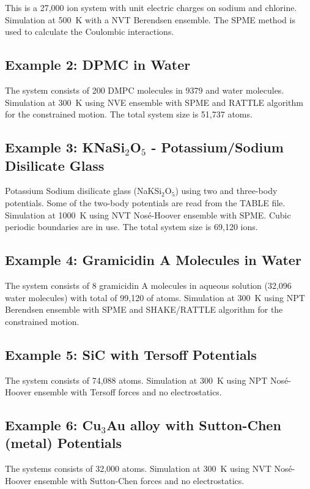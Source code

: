 This is a 27,000 ion system with unit electric charges on sodium and
chlorine.  Simulation at 500~K with a NVT Berendsen ensemble.  The SPME
method is used to calculate the Coulombic interactions.

\subsection{Example 2: DPMC in Water}

The system consists of 200 DMPC molecules in 9379 and water molecules.
Simulation at 300~K using NVE ensemble with SPME and RATTLE algorithm
for the constrained motion.  The total system size is 51,737 atoms.

\subsection{Example 3: KNaSi$_{2}$O$_{5}$ - Potassium/Sodium Disilicate Glass}

Potassium Sodium disilicate glass (NaKSi$_{2}$O$_{5}$) using two and
three-body potentials.  Some of the two-body potentials are read
from the TABLE file.  Simulation at 1000~K using NVT Nos\'e-Hoover
ensemble with SPME.  Cubic periodic boundaries are in use.  The
total system size is 69,120 ions.

\subsection{Example 4: Gramicidin A Molecules in Water}

The system consists of 8 gramicidin A molecules in aqueous solution
(32,096 water molecules) with total of 99,120 of atoms.  Simulation
at 300~K using NPT Berendsen ensemble with SPME and SHAKE/RATTLE
algorithm for the constrained motion.

\subsection{Example 5: SiC with Tersoff Potentials}

The system consists of 74,088 atoms.  Simulation at 300~K using NPT
Nos\'e-Hoover ensemble with Tersoff forces and no electrostatics.

\subsection{Example 6: Cu$_{3}$Au alloy with Sutton-Chen (metal) Potentials}

The systems consists of 32,000 atoms.  Simulation at 300~K using NVT
Nos\'e-Hoover ensemble with Sutton-Chen forces and no electrostatics.

